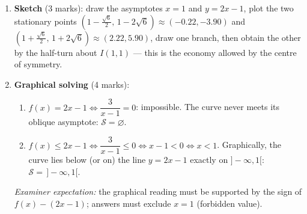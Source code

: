 \documentclass[11pt]{article}
\begin{document}
\begin{corrige}
\begin{enumerate}
\item \textbf{Sketch} (3 marks): draw the asymptotes $x=1$ and $y=2x-1$, plot the two stationary points $\left(1-\frac{\sqrt6}{2},\,1-2\sqrt6\right)\approx(-0.22,-3.90)$ and $\left(1+\frac{\sqrt6}{2},\,1+2\sqrt6\right)\approx(2.22,5.90)$, draw one branch, then obtain the other by the half-turn about $I(1,1)$ — this is the economy allowed by the centre of symmetry.

\item \textbf{Graphical solving} (4 marks):
\begin{enumerate}
\item $f(x)=2x-1 \iff \dfrac{3}{x-1}=0$: impossible. The curve never meets its oblique asymptote: $\mathcal{S}=\varnothing$.
\item $f(x)\leq 2x-1 \iff \dfrac{3}{x-1}\leq 0 \iff x-1<0 \iff x<1$. Graphically, the curve lies below (or on) the line $y=2x-1$ exactly on $]-\infty,1[$: $\mathcal{S}=\,]-\infty,1[$.
\end{enumerate}
\emph{Examiner expectation:} the graphical reading must be supported by the sign of $f(x)-(2x-1)$; answers must exclude $x=1$ (forbidden value).
\end{enumerate}
\end{corrige}
\end{document}
